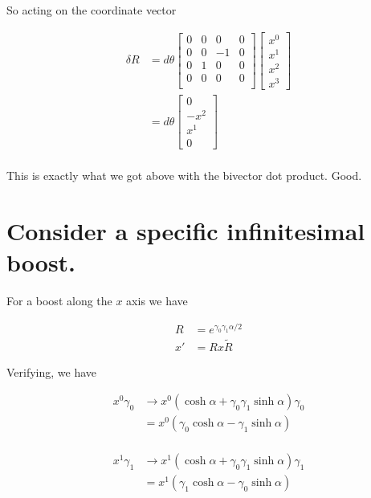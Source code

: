 So acting on the coordinate vector

\begin{align*}
\delta R &= d\theta
\begin{bmatrix}
0 & 0 & 0 & 0 \\
0 & 0 & -1 & 0 \\
0 & 1 & 0 & 0 \\
0 & 0 & 0 & 0 \\
\end{bmatrix} 
\begin{bmatrix}
x^0 \\
x^1 \\
x^2 \\
x^3
\end{bmatrix} \\
&=
d\theta
\begin{bmatrix}
0 \\
-x^2 \\
x^1 \\
0
\end{bmatrix} \\
\end{align*}

This is exactly what we got above with the bivector dot product.  Good.

\section{Consider a specific infinitesimal boost.}

For a boost along the $x$ axis we have

\begin{align}
R &= e^{\gamma_0\gamma_1 \alpha/2} \\
x' &= R x \tilde{R}
\end{align}

Verifying, we have

\begin{align*}
x^0 \gamma_0 
&\rightarrow x^0 ( \cosh\alpha + \gamma_0 \gamma_1 \sinh\alpha ) \gamma_0 \\
&= x^0 ( \gamma_0 \cosh\alpha - \gamma_1 \sinh\alpha ) \\
\end{align*}

\begin{align*}
x^1 \gamma_1 
&\rightarrow x^1 ( \cosh\alpha + \gamma_0 \gamma_1 \sinh\alpha ) \gamma_1 \\
&= x^1 ( \gamma_1 \cosh\alpha - \gamma_0 \sinh\alpha ) \\
\end{align*}

